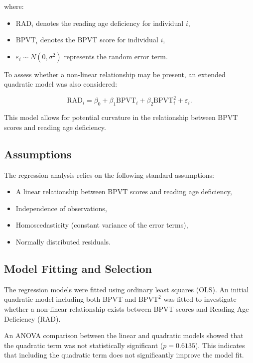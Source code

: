 \documentclass[11pt, a4paper]{article}
\begin{document}
where:
\begin{itemize}
    \item $\text{RAD}_i$ denotes the reading age deficiency for individual $i$,
    \item $\text{BPVT}_i$ denotes the BPVT score for individual $i$,
    \item $\varepsilon_i \sim N(0, \sigma^2)$ represents the random error term.
\end{itemize}

To assess whether a non-linear relationship may be present, an extended quadratic model was also considered:

\begin{equation}
\text{RAD}_i = \beta_0 + \beta_1 \text{BPVT}_i + \beta_2 \text{BPVT}_i^2 + \varepsilon_i.
\end{equation}

This model allows for potential curvature in the relationship between BPVT scores and reading age deficiency.

\subsection{Assumptions}
The regression analysis relies on the following standard assumptions:

\begin{itemize}
    \item A linear relationship between BPVT scores and reading age deficiency,
    \item Independence of observations,
    \item Homoscedasticity (constant variance of the error terms),
    \item Normally distributed residuals.
\end{itemize}

\subsection{Model Fitting and Selection}

The regression models were fitted using ordinary least squares (OLS). An initial
quadratic model including both BPVT and $\text{BPVT}^2$ was fitted to investigate
whether a non-linear relationship exists between BPVT scores and Reading Age
Deficiency (RAD).

An ANOVA comparison between the linear and quadratic models showed that the
quadratic term was not statistically significant ($p = 0.6135$). This indicates
that including the quadratic term does not significantly improve the model fit.
\end{document}
